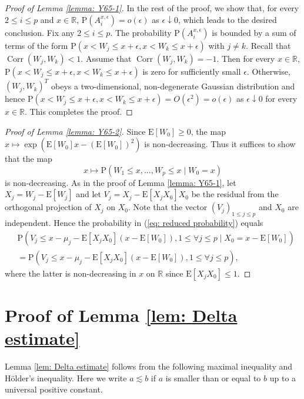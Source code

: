 \documentclass[11pt,reqno]{amsart}
\theoremstyle{definition}
\newcommand{\Ep}{{\mathrm{E}}}
\renewcommand{\Pr}{{\mathrm{P}}}
\newcommand{\RR}{\mathbb{R}}
\DeclareMathOperator{\Corr}{Corr}
\begin{document}
\begin{proof}[Proof of Lemma \ref{lemma: Y65-1}]
In the rest of the proof, we  show that, for every $2 \leq i \leq p$ and $x \in \RR$, $\Pr(A_{i}^{x,\epsilon}) = o(\epsilon)$ as $\epsilon \downarrow 0$, which leads to the desired conclusion. Fix any $2 \leq i \leq p$. The probability $\Pr(A_{i}^{x,\epsilon})$ is bounded by a sum of terms of the form  $\Pr(x < W_{j} \leq x+\epsilon, x < W_{k} \leq x+\epsilon)$ with $j \neq k$. Recall that $\Corr(W_{j},W_{k})<1$. Assume that $\Corr(W_{j},W_{k})=-1$. Then for  every $x \in \RR$, $\Pr(x < W_{j} \leq x+\epsilon, x < W_{k} \leq x+\epsilon)$ is zero for sufficiently small $\epsilon$. Otherwise, $(W_{j},W_{k})^{T}$ obeys a two-dimensional, non-degenerate Gaussian distribution and hence $\Pr(x < W_{j} \leq x+\epsilon, x < W_{k} \leq x+\epsilon) = O(\epsilon^{2}) = o(\epsilon)$ as $\epsilon \downarrow 0$ for every $x \in \RR$. This completes the proof.
\end{proof}

\begin{proof}[Proof of Lemma \ref{lemma: Y65-2}]
Since $\Ep [ W_{0} ] \geq 0$, the map $x \mapsto \exp( \Ep[ W_{0} ] x- (\Ep[ W_{0} ])^{2} )$ is non-decreasing. Thus it suffices to show that the map
\begin{equation}\label{eq: reduced probability}
x \mapsto \Pr ( W_{1} \leq x, \dots,  W_{p} \leq x \mid W_{0} =x)
\end{equation}
is non-decreasing.
As in the proof of Lemma \ref{lemma: Y65-1}, let $X_{j}=W_{j}-\Ep [ W_{j} ]$ and let $V_{j} = X_{j} - \Ep[ X_{j} X_{0}] X_{0}$ be the residual from the orthogonal projection of $X_{j}$ on $X_{0}$.  Note that the vector $(V_{j})_{1 \leq j \leq p}$ and $X_{0}$ are independent.
Hence the  probability in (\ref{eq: reduced probability}) equals
\begin{align*}
&\Pr(V_{j} \leq x-\mu_{j} - \Ep[X_{j}X_{0}](x-\Ep[ W_{0} ] ),  1  \leq \forall j \leq p \mid X_{0}=x-\Ep[ W_{0} ])\\
&=\Pr(V_{j} \leq x-\mu_{j} - \Ep[X_{j}X_{0}](x-\Ep[ W_{0} ]),  1  \leq \forall j \leq p),
\end{align*}
where the latter is non-decreasing in $x$ on $\RR$ since $\Ep[X_{j}X_{0}] \leq 1$.
\end{proof}

\appendix

\section{Proof of Lemma \ref{lem: Delta estimate}}

Lemma \ref{lem: Delta estimate} follows from the following maximal inequality and H\"{o}lder's inequality. Here we write $a \lesssim b$  if $a$ is smaller than or equal to $b$ up to a universal positive constant.
\end{document}
